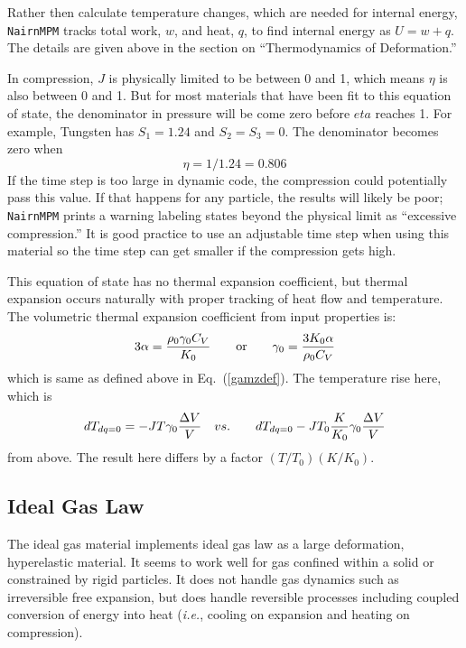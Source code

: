 \documentclass[11pt]{article}
\begin{document}
Rather then calculate temperature changes, which are needed for internal energy, {\tt NairnMPM} tracks total work, $w$, and heat, $q$, to find internal energy as $U = w+q$. The details are given above in the section on ``Thermodynamics of Deformation.''

In compression, $J$ is physically limited to be between 0 and 1, which means $\eta$ is also between 0 and 1. But for most materials that have been fit to this equation of state, the denominator in pressure will be come zero before $eta$ reaches 1. For example, Tungsten has $S_1=1.24$ and $S_2=S_3=0$. The denominator becomes zero when
\begin{equation}
     \eta = 1/1.24 = 0.806
\end{equation}
If the time step is too large in dynamic code, the compression could potentially pass this value. If that happens for any particle, the results will likely be poor; {\tt NairnMPM} prints a warning labeling states beyond the physical limit as ``excessive compression.'' It is good practice to use an adjustable time step when using this material so the time step can get smaller if the compression gets high.

This equation of state has no thermal expansion coefficient, but thermal expansion occurs naturally with proper tracking of heat flow and temperature. The volumetric thermal expansion coefficient from input properties is:
\begin{equation}
     3\alpha = {\rho_0 \gamma_0 C_V\over K_0} \qquad{\rm or}\qquad \gamma_0 = {3K_0\alpha\over \rho_0 C_V}
\end{equation}
which is same as defined above in Eq.~(\ref{gamzdef}). The temperature rise here, which is
\begin{equation}
     dT_{dq=0} = - J T\gamma_0 {\Delta V\over V}    \quad vs. \qquad  dT_{dq=0} -JT_0  {K\over K_0} \gamma_0 {\Delta V\over V}     \label{mgdt}
\end{equation}
from above. The result here differs by a factor $(T/T_0)(K/K_0)$.

\subsection{Ideal Gas Law}

The ideal gas material implements ideal gas law as a large deformation, hyperelastic material. It seems to work well for gas confined within a solid or constrained by rigid particles. It does not handle gas dynamics such as irreversible free expansion, but does handle reversible processes including coupled conversion of energy into heat ({\em i.e.}, cooling on expansion and heating on compression).
\end{document}
